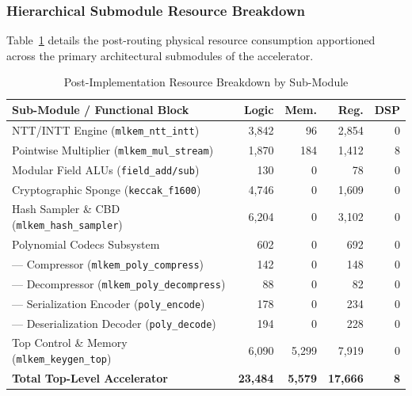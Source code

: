 \subsubsection{Hierarchical Submodule Resource Breakdown}
Table~\ref{tab:submodule_utilization} details the post-routing physical resource consumption apportioned across the primary architectural submodules of the accelerator.

\begin{table}[htbp]
\caption{Post-Implementation Resource Breakdown by Sub-Module}
\label{tab:submodule_utilization}
\centering
\scriptsize
\setlength{\tabcolsep}{2.5pt}
\begin{tabular}{lrrrr}
\toprule
\textbf{Sub-Module / Functional Block} & \textbf{Logic} & \textbf{Mem.} & \textbf{Reg.} & \textbf{DSP} \\
\midrule
NTT/INTT Engine (\texttt{mlkem\_ntt\_intt}) & 3,842 & 96 & 2,854 & 0 \\
Pointwise Multiplier (\texttt{mlkem\_mul\_stream}) & 1,870 & 184 & 1,412 & 8 \\
Modular Field ALUs (\texttt{field\_add/sub}) & 130 & 0 & 78 & 0 \\
Cryptographic Sponge (\texttt{keccak\_f1600}) & 4,746 & 0 & 1,609 & 0 \\
Hash Sampler \& CBD (\texttt{mlkem\_hash\_sampler}) & 6,204 & 0 & 3,102 & 0 \\
Polynomial Codecs Subsystem & 602 & 0 & 692 & 0 \\
\quad --- Compressor (\texttt{mlkem\_poly\_compress}) & 142 & 0 & 148 & 0 \\
\quad --- Decompressor (\texttt{mlkem\_poly\_decompress}) & 88 & 0 & 82 & 0 \\
\quad --- Serialization Encoder (\texttt{poly\_encode}) & 178 & 0 & 234 & 0 \\
\quad --- Deserialization Decoder (\texttt{poly\_decode}) & 194 & 0 & 228 & 0 \\
Top Control \& Memory (\texttt{mlkem\_keygen\_top}) & 6,090 & 5,299 & 7,919 & 0 \\
\midrule
\textbf{Total Top-Level Accelerator} & \textbf{23,484} & \textbf{5,579} & \textbf{17,666} & \textbf{8} \\
\bottomrule
\end{tabular}
\end{table}

